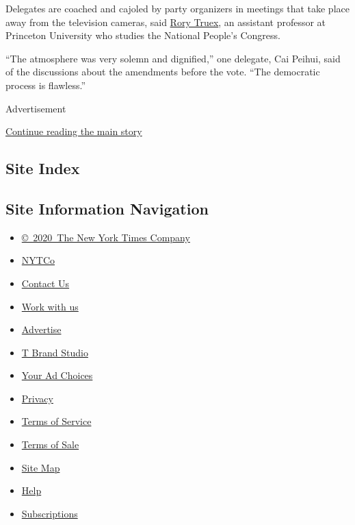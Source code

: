 Delegates are coached and cajoled by party organizers in meetings that
take place away from the television cameras, said
\href{http://wws.princeton.edu/faculty-research/faculty/rtruex}{Rory
Truex}, an assistant professor at Princeton University who studies the
National People's Congress.

``The atmosphere was very solemn and dignified,'' one delegate, Cai
Peihui, said of the discussions about the amendments before the vote.
``The democratic process is flawless.''

Advertisement

\protect\hyperlink{after-bottom}{Continue reading the main story}

\hypertarget{site-index}{%
\subsection{Site Index}\label{site-index}}

\hypertarget{site-information-navigation}{%
\subsection{Site Information
Navigation}\label{site-information-navigation}}

\begin{itemize}
\tightlist
\item
  \href{https://help.nytimes.com/hc/en-us/articles/115014792127-Copyright-notice}{©~2020~The
  New York Times Company}
\end{itemize}

\begin{itemize}
\tightlist
\item
  \href{https://www.nytco.com/}{NYTCo}
\item
  \href{https://help.nytimes.com/hc/en-us/articles/115015385887-Contact-Us}{Contact
  Us}
\item
  \href{https://www.nytco.com/careers/}{Work with us}
\item
  \href{https://nytmediakit.com/}{Advertise}
\item
  \href{http://www.tbrandstudio.com/}{T Brand Studio}
\item
  \href{https://www.nytimes.com/privacy/cookie-policy\#how-do-i-manage-trackers}{Your
  Ad Choices}
\item
  \href{https://www.nytimes.com/privacy}{Privacy}
\item
  \href{https://help.nytimes.com/hc/en-us/articles/115014893428-Terms-of-service}{Terms
  of Service}
\item
  \href{https://help.nytimes.com/hc/en-us/articles/115014893968-Terms-of-sale}{Terms
  of Sale}
\item
  \href{https://spiderbites.nytimes.com}{Site Map}
\item
  \href{https://help.nytimes.com/hc/en-us}{Help}
\item
  \href{https://www.nytimes.com/subscription?campaignId=37WXW}{Subscriptions}
\end{itemize}
